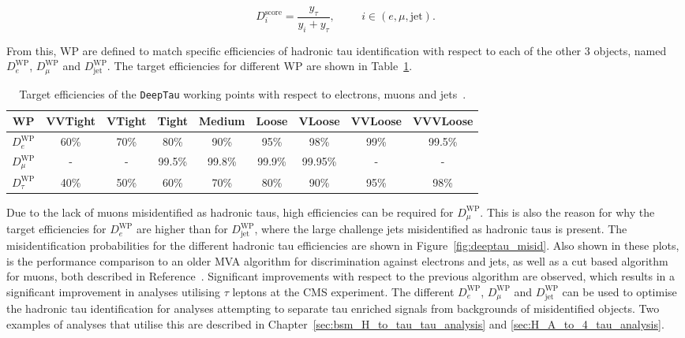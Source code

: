 \begin{equation}
D_{i}^{\text{score}} = \frac{y_\tau}{y_i + y_{\tau}}, \hspace{1cm} i \in (e,\mu,\text{jet}).
\end{equation}

From this, \ac{WP} are defined to match specific efficiencies of hadronic tau identification with respect to each of the other 3 objects, named $D_{e}^{\text{WP}}$, $D_{\mu}^{\text{WP}}$ and $D_{\text{jet}}^{\text{WP}}$.
The target efficiencies for different \ac{WP} are shown in Table~\ref{tab:deeptau_eff}. \\

\begin{table}[!hbtp]
\begin{adjustwidth}{-1cm}{-1cm}
\centering
\begin{tabular}{|c|cccccccc|}
\hline
WP                     & VVTight & VTight & Tight  & Medium & Loose  & VLoose  & VVLoose & VVVLoose \\
\hline 
\hline
$D_{e}^{\text{WP}}$    & 60\%    & 70\%   & 80\%   & 90\%   & 95\%   & 98\%    & 99\%    & 99.5\%   \\
$D_{\mu}^{\text{WP}}$  & -       & -      & 99.5\% & 99.8\% & 99.9\% & 99.95\% & -       & -        \\
$D_{\tau}^{\text{WP}}$ & 40\%    & 50\%   & 60\%   & 70\%   & 80\%   & 90\%    & 95\%    & 98\%     \\
\hline
\end{tabular}
\caption{Target efficiencies of the \texttt{DeepTau} working points with respect to electrons, muons and jets~\cite{CMS:2022prd}.}
\label{tab:deeptau_eff}
\end{adjustwidth}
\end{table}

Due to the lack of muons misidentified as hadronic taus, high efficiencies can be required for $D_{\mu}^{\text{WP}}$.
This is also the reason for why the target efficiencies for $D_{e}^{\text{WP}}$ are higher than for $D_{\text{jet}}^{\text{WP}}$, where the large challenge jets misidentified as hadronic taus is present.
The misidentification probabilities for the different hadronic tau efficiencies are shown in Figure~\ref{fig:deeptau_misid}.
Also shown in these plots, is the performance comparison to an older \ac{MVA} algorithm for discrimination against electrons and jets, as well as a cut based algorithm for muons, both described in Reference~\cite{CMS:2018jrd}.
Significant improvements with respect to the previous algorithm are observed, which results in a significant improvement in analyses utilising $\tau$ leptons at the \ac{CMS} experiment.
The different $D_{e}^{\text{WP}}$, $D_{\mu}^{\text{WP}}$ and $D_{\text{jet}}^{\text{WP}}$ can be used to optimise the hadronic tau identification for analyses attempting to separate tau enriched signals from backgrounds of misidentified objects.
Two examples of analyses that utilise this are described in Chapter~\ref{sec:bsm_H_to_tau_tau_analysis} and \ref{sec:H_A_to_4_tau_analysis}.

